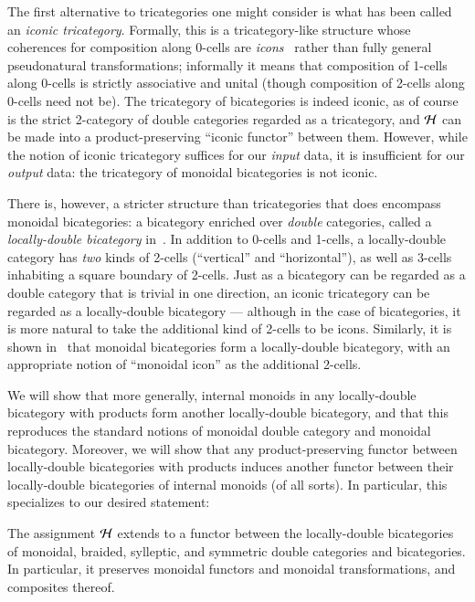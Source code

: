 The first alternative to tricategories one might consider is what has been called an \emph{iconic tricategory}.
Formally, this is a tricategory-like structure whose coherences for composition along 0-cells are \emph{icons}~\cite{lack:icons} rather than fully general pseudonatural transformations; informally it means that composition of 1-cells along 0-cells is strictly associative and unital (though composition of 2-cells along 0-cells need not be).
The tricategory of bicategories is indeed iconic, as of course is the strict 2-category of double categories regarded as a tricategory, and $\mathcal{H}$ can be made into a product-preserving ``iconic functor'' between them.
However, while the notion of iconic tricategory suffices for our \emph{input} data, it is insufficient for our \emph{output} data: the tricategory of monoidal bicategories is not iconic.

There is, however, a stricter structure than tricategories that does encompass monoidal bicategories: a bicategory enriched over \emph{double} categories, called a \emph{locally-double bicategory} in~\cite{gg:ldstr-tricat}.
In addition to 0-cells and 1-cells, a locally-double category has \emph{two} kinds of 2-cells (``vertical'' and ``horizontal''), as well as 3-cells inhabiting a square boundary of 2-cells.
Just as a bicategory can be regarded as a double category that is trivial in one direction, an iconic tricategory can be regarded as a locally-double bicategory --- although in the case of bicategories, it is more natural to take the additional kind of 2-cells to be icons.
Similarly, it is shown in~\cite{gg:ldstr-tricat} that monoidal bicategories form a locally-double bicategory, with an appropriate notion of ``monoidal icon'' as the additional 2-cells.

We will show that more generally, internal monoids in any locally-double bicategory with products form another locally-double bicategory, and that this reproduces the standard notions of monoidal double category and monoidal bicategory.
Moreover, we will show that any product-preserving functor between locally-double bicategories with products induces another functor between their locally-double bicategories of internal monoids (of all sorts).
In particular, this specializes to our desired statement:

\begin{thm}\label{thm:functor-intro}
  The assignment $\mathcal{H}$ extends to a functor between the locally-double bicategories of monoidal, braided, sylleptic, and symmetric double categories and bicategories.
  In particular, it preserves monoidal functors and monoidal transformations, and composites thereof.
\end{thm}

